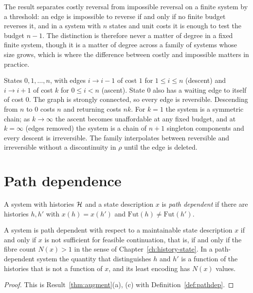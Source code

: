 The result separates costly reversal from impossible reversal on a finite system by a threshold: an edge is impossible to reverse if and only if no finite budget reverses it, and in a system with $n$ states and unit costs it is enough to test the budget $n-1$. The distinction is therefore never a matter of degree in a fixed finite system, though it is a matter of degree across a family of systems whose size grows, which is where the difference between costly and impossible matters in practice.

\begin{example}[A well]\label{ex:well}
States $0,1,\dots,n$, with edges $i\to i-1$ of cost $1$ for $1\le i\le n$ (descent) and $i\to i+1$ of cost $k$ for $0\le i<n$ (ascent). State $0$ also has a waiting edge to itself of cost $0$. The graph is strongly connected, so every edge is reversible. Descending from $n$ to $0$ costs $n$ and returning costs $nk$. For $k=1$ the system is a symmetric chain; as $k\to\infty$ the ascent becomes unaffordable at any fixed budget, and at $k=\infty$ (edges removed) the system is a chain of $n+1$ singleton components and every descent is irreversible. The family interpolates between reversible and irreversible without a discontinuity in $\rho$ until the edge is deleted.
\end{example}

\section{Path dependence}

\begin{definition}\label{def:pathdep}
A system with histories $\mathcal{H}$ and a state description $x$ is \emph{path dependent} if there are histories $h,h'$ with $x(h)=x(h')$ and $\mathrm{Fut}(h)\ne\mathrm{Fut}(h')$.
\end{definition}

\begin{newresult}\label{prop:pathdep}
A system is path dependent with respect to a maintainable state description $x$ if and only if $x$ is not sufficient for feasible continuation, that is, if and only if the fibre count $N(x)>1$ in the sense of Chapter~\ref{ch:history-state}. In a path-dependent system the quantity that distinguishes $h$ and $h'$ is a function of the histories that is not a function of $x$, and its least encoding has $N(x)$ values.
\end{newresult}
\begin{proof}
This is Result~\ref{thm:augment}(a), (c) with Definition~\ref{def:pathdep}.
\end{proof}

